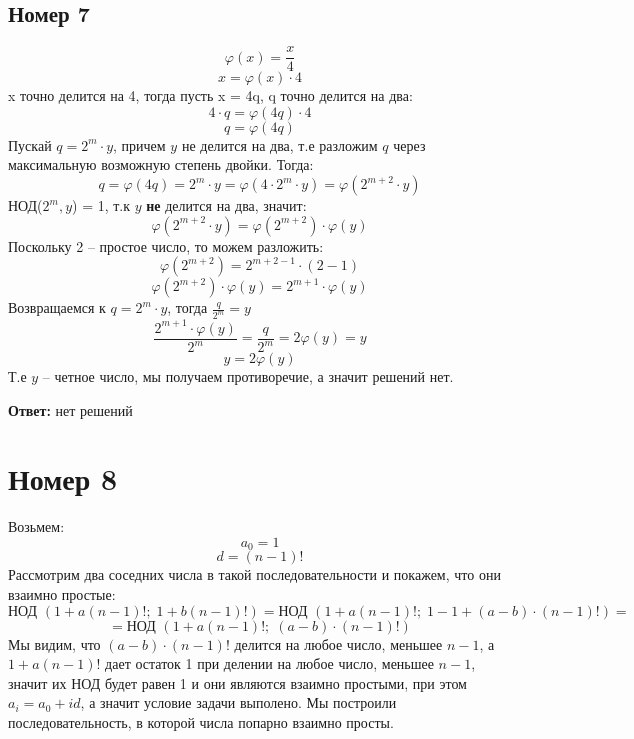 \documentclass[a4paper,12pt]{article}
\begin{document}
\subsection*{Номер 7}
\[
\varphi(x) = \frac{x}{4}
\]
\[
x = \varphi(x)  \cdot 4 
\]
x точно делится на 4, тогда пусть x = 4q, q точно делится на два:
\[
4 \cdot q = \varphi(4q) \cdot 4
\]
\[
q = \varphi(4q) 
\]
Пускай $q = 2^m \cdot y$, причем $y$ не делится на два, т.е разложим $q$ через максимальную возможную степень двойки. Тогда:
\[
q = \varphi(4q) = 2^m \cdot y = \varphi(4 \cdot 2^m \cdot y) = \varphi(2^{m+2} \cdot y)
\]
НОД($2^m, y$) = 1, т.к $y$ \textbf{не} делится на два, значит:
\[
\varphi(2^{m+2} \cdot y) = \varphi(2^{m+2}) \cdot \varphi(y)
\]
Поскольку 2 -- простое число, то можем разложить:
\[
\varphi(2^{m+2}) = 2^{m+2 - 1} \cdot (2 - 1)
\]
\[
\varphi(2^{m+2}) \cdot \varphi(y) = 2^{m+1} \cdot \varphi(y)
\]
Возвращаемся к $q = 2^m \cdot y$, тогда $\frac{q}{2^m} = y$
\[
\frac{2^{m+1} \cdot \varphi(y)}{2^m} = \frac{q}{2^m} = 2\varphi(y) = y
\]
\[
y = 2\varphi(y)
\]
Т.е $y$ -- четное число, мы получаем противоречие, а значит решений нет.
\begin{center}
\textbf{Ответ:} нет решений
\end{center}
\section*{Номер 8}
Возьмем:
\[
a_0 = 1
\]
\[
d = (n-1)!
\]
Рассмотрим два соседних числа в такой последовательности и покажем, что они взаимно простые:
\[
\text{НОД } (1 + a(n-1)!; \;1 + b(n-1)!) = \text{НОД } (1 + a(n-1)!; \;1 - 1 + (a - b) \cdot (n-1)!) =
\]
\[ 
= \text{НОД } (1 + a(n-1)!; \; (a - b) \cdot (n-1)!)
\]
Мы видим, что $(a-b) \cdot (n-1)!$ делится на любое число, меньшее $n-1$, а $1 + a(n-1)!$ дает остаток 1 при делении на любое число, меньшее $n-1$, значит их НОД будет равен 1 и они являются взаимно простыми, при этом $a_i = a_0 + id$, а значит условие задачи выполено. Мы построили последовательность, в которой числа попарно взаимно просты.
\end{document}
